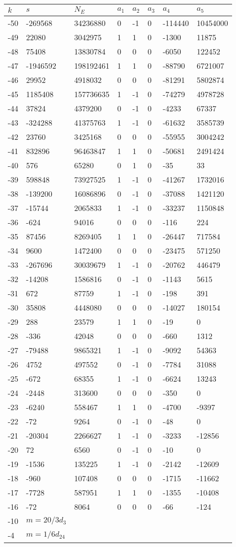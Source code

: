 \documentclass{amsart}
\begin{document}
\begin{longtable}{|l|l|l|lllll|}
\hline
$k$ & $s$ & $N_E$ & $a_1$ & $a_2$ & $a_3$ & $a_4$ & $a_5$\\
\hline
-50&-269568&34236880&0&-1&0&-114440&10454000\\
-49&22080&3042975&1&1&0&-1300&11875\\
-48&75408&13830784&0&0&0&-6050&122452\\
-47&-1946592&198192461&1&1&0&-88790&6721007\\
-46&29952&4918032&0&0&0&-81291&5802874\\
-45&1185408&157736635&1&-1&0&-74279&4978728\\
-44&37824&4379200&0&-1&0&-4233&67337\\
-43&-324288&41375763&1&-1&0&-61632&3585739\\
-42&23760&3425168&0&0&0&-55955&3004242\\
-41&832896&96463847&1&1&0&-50681&2491424\\
-40&576&65280&0&1&0&-35&33\\
-39&598848&73927525&1&-1&0&-41267&1732016\\
-38&-139200&16086896&0&-1&0&-37088&1421120\\
-37&-15744&2065833&1&-1&0&-33237&1150848\\
-36&-624&94016&0&0&0&-116&224\\
-35&87456&8269405&1&1&0&-26447&717584\\
-34&9600&1472400&0&0&0&-23475&571250\\
-33&-267696&30039679&1&-1&0&-20762&446479\\
-32&-14208&1586816&0&-1&0&-1143&5615\\
-31&672&87759&1&-1&0&-198&391\\
-30&35808&4448080&0&0&0&-14027&180154\\
-29&288&23579&1&1&0&-19&0\\
-28&-336&42048&0&0&0&-660&1312\\
-27&-79488&9865321&1&-1&0&-9092&54363\\
-26&4752&497552&0&-1&0&-7784&31088\\
-25&-672&68355&1&-1&0&-6624&13243\\
-24&-2448&313600&0&0&0&-350&0\\
-23&-6240&558467&1&1&0&-4700&-9397\\
-22&-72&9264&0&-1&0&-48&0\\
-21&-20304&2266627&1&-1&0&-3233&-12856\\
-20&72&6560&0&-1&0&-10&0\\
-19&-1536&135225&1&-1&0&-2142&-12609\\
-18&-960&107408&0&0&0&-1715&-11662\\
-17&-7728&587951&1&1&0&-1355&-10408\\
-16&-72&8064&0&0&0&-66&-124\\
-10&$m=20/3d_{3}$&&\multicolumn{5}{c|}{}\\
-4&$m=1/6d_{24}$&&\multicolumn{5}{c|}{}\\
\hline
\end{longtable}
\end{document}
